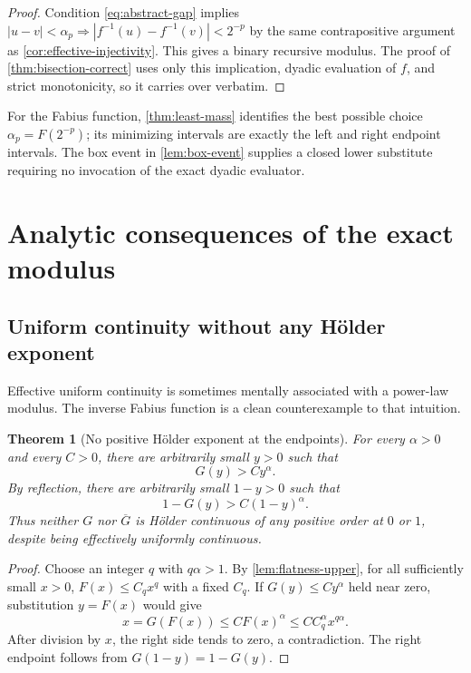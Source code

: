 \documentclass[11pt,oneside]{article}
\newtheorem{theorem}{Theorem}[section]
\theoremstyle{definition}
\theoremstyle{remark}
\numberwithin{equation}{section}
\newcommand{\InvT}{\overline G}
\begin{document}
\begin{proof}
Condition \eqref{eq:abstract-gap} implies
$|u-v|<\alpha_p\Rightarrow|f^{-1}(u)-f^{-1}(v)|<2^{-p}$ by the same
contrapositive argument as \cref{cor:effective-injectivity}.  This gives a
binary recursive modulus.  The proof of
\cref{thm:bisection-correct} uses only this implication, dyadic evaluation of
$f$, and strict monotonicity, so it carries over verbatim.
\end{proof}

For the Fabius function, \cref{thm:least-mass} identifies the best possible
choice $\alpha_p=F(2^{-p})$; its minimizing intervals are exactly the left and
right endpoint intervals.  The box event in \cref{lem:box-event} supplies a
closed lower substitute requiring no invocation of the exact dyadic evaluator.

\section{Analytic consequences of the exact modulus}

\subsection{Uniform continuity without any H\"older exponent}

Effective uniform continuity is sometimes mentally associated with a power-law
modulus.  The inverse Fabius function is a clean counterexample to that
intuition.

\begin{theorem}[No positive H\"older exponent at the endpoints]
\label{thm:no-holder}
For every $\alpha>0$ and every $C>0$, there are arbitrarily small $y>0$ such
that
\begin{equation}\label{eq:no-holder-zero}
 G(y)>Cy^\alpha.
\end{equation}
By reflection, there are arbitrarily small $1-y>0$ such that
\begin{equation}\label{eq:no-holder-one}
 1-G(y)>C(1-y)^\alpha.
\end{equation}
Thus neither $G$ nor $\InvT$ is H\"older continuous of any positive order at
$0$ or $1$, despite being effectively uniformly continuous.
\end{theorem}

\begin{proof}
Choose an integer $q$ with $q\alpha>1$.  By
\cref{lem:flatness-upper}, for all sufficiently small $x>0$,
$F(x)\le C_qx^q$ with a fixed $C_q$.  If $G(y)\le Cy^\alpha$ held near zero,
substitution $y=F(x)$ would give
\[
 x=G(F(x))\le C F(x)^\alpha
 \le C C_q^\alpha x^{q\alpha}.
\]
After division by $x$, the right side tends to zero, a contradiction.  The
right endpoint follows from $G(1-y)=1-G(y)$.
\end{proof}
\end{document}
